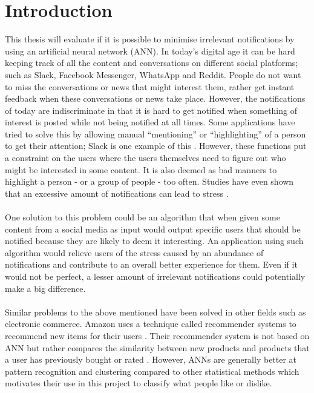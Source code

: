 \chapter{Introduction}

This thesis will evaluate if it is possible to minimise irrelevant notifications by using an artificial neural network (ANN). In today’s digital age it can be hard keeping track of all the content and conversations on different social platforms; such as Slack, Facebook Messenger, WhatsApp and Reddit. People do not want to miss the conversations or news that might interest them, rather get instant feedback when these conversations or news take place. However, the notifications of today are indiscriminate in that it is hard to get notified when something of interest is posted while not being notified at all times. Some applications have tried to solve this by allowing manual “mentioning” or “highlighting” of a person to get their attention; Slack is one example of this \parencite{slack}. However, these functions put a constraint on the users where the users themselves need to figure out who might be interested in some content. It is also deemed as bad manners to highlight a person - or a group of people - too often. Studies have even shown that an excessive amount of notifications can lead to stress \parencite{relaffinity}.
\\\\
One solution to this problem could be an algorithm that when given some content from a social media as input would output specific users that should be notified because they are likely to deem it interesting. An application using such algorithm would relieve users of the stress caused by an abundance of notifications and contribute to an overall better experience for them. Even if it would not be perfect, a lesser amount of irrelevant notifications could potentially make a big difference.
\\\\
Similar problems to the above mentioned have been solved in other fields such as electronic commerce. Amazon uses a technique called recommender systems to recommend new items for their users \parencite{amazonfiltering}. Their recommender system is not based on ANN but rather compares the similarity between new products and products that a user has previously bought or rated \parencite{amazonfiltering}. However, ANNs are generally better at pattern recognition and clustering compared to other statistical methods \parencite{basheer2000artificial} which motivates their use in this project to classify what people like or dislike.

